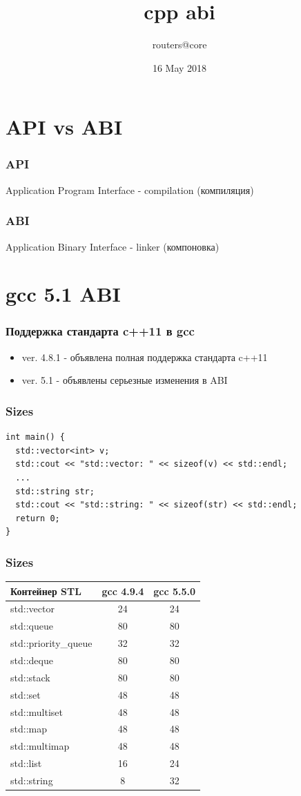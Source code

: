 \documentclass{beamer}
\title[CPP ABI]
    {cpp abi}
\author{routers@core}
\date{16 May 2018}
\begin{document}
\maketitle

\section{API vs ABI}

\begin{frame}[fragile]
\frametitle{API}
Application Program Interface - compilation (компиляция)
\end{frame}

\begin{frame}[fragile]
\frametitle{ABI}
Application Binary Interface - linker (компоновка)
\end{frame}

\section{gcc 5.1 ABI}

\begin{frame}[fragile]
\frametitle{Поддержка стандарта c++11 в gcc}
\begin{itemize}
\item ver. 4.8.1 - объявлена полная поддержка стандарта c++11
\item ver. 5.1 - объявлены серьезные изменения в ABI
\end{itemize}
\end{frame}

\begin{frame}[fragile]
\frametitle{Sizes}
\begin{verbatim}
int main() {
  std::vector<int> v;
  std::cout << "std::vector: " << sizeof(v) << std::endl;  
  ...
  std::string str;
  std::cout << "std::string: " << sizeof(str) << std::endl;  
  return 0;
}
\end{verbatim}
\end{frame}

\begin{frame}[fragile]
\frametitle{Sizes}
\begin{longtable}{|l|c|c|}
\hline
Контейнер STL & gcc 4.9.4 & gcc 5.5.0 \\
\hline
std::vector & 24 & 24 \\
std::queue & 80 & 80 \\
std::priority\_queue & 32 & 32 \\
std::deque & 80 & 80 \\
std::stack & 80 & 80 \\
std::set & 48 & 48 \\
std::multiset & 48 & 48 \\
std::map & 48 & 48 \\
std::multimap & 48 & 48 \\
std::list & 16 & 24 \\
std::string & 8 & 32 \\
\hline
\end{longtable}
\end{frame}
\end{document}

